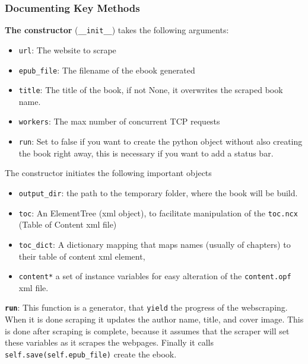 \documentclass[]{report}   %
\begin{document}
\subsubsection{Documenting Key Methods}
\textbf{The constructor} (\texttt{\_\_init\_\_}) takes the following arguments:
\begin{itemize}
	\item \texttt{url}: The website to scrape
	\item \texttt{epub\_file}: The filename of the ebook generated
	\item \texttt{title}: The title of the book, if not None, it overwrites the scraped book name.
	\item \texttt{workers}: The max number of concurrent TCP requests
	\item \texttt{run}: Set to false if you want to create the python object without also creating the book right away, this is necessary if you want to add a status bar. 
\end{itemize}

The constructor initiates the following important objects
\begin{itemize}
	\item \texttt{output\_dir}: the path to the temporary folder, where the book will be build.
	\item \texttt{toc}: An ElementTree (xml object), to facilitate manipulation of the \texttt{toc.ncx} (Table of Content xml file)
	\item \texttt{toc\_dict}: A dictionary mapping that maps names (usually of chapters) to their table of content xml element, 
	\item \texttt{content*} a set of instance variables for easy alteration of the \texttt{content.opf} xml file.
\end{itemize}


\textbf{\texttt{run}}: This function is a generator, that \texttt{yield} the progress of
the webscraping. When it is done scraping it updates the author name, title,
and cover image. This is done after scraping is complete,
because it assumes that the scraper will set these variables as it scrapes the
webpages. Finally it calls \texttt{self.save(self.epub\_file)} create the ebook.


\end{document}
